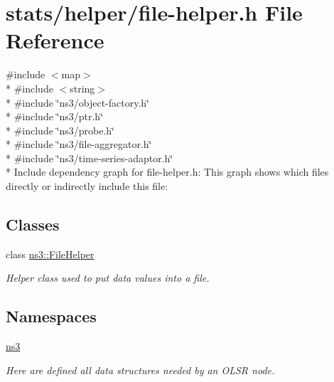 \hypertarget{file-helper_8h}{}\section{stats/helper/file-\/helper.h File Reference}
\label{file-helper_8h}
{\ttfamily \#include $<$map$>$}\\*
{\ttfamily \#include $<$string$>$}\\*
{\ttfamily \#include \char`\"{}ns3/object-\/factory.\+h\char`\"{}}\\*
{\ttfamily \#include \char`\"{}ns3/ptr.\+h\char`\"{}}\\*
{\ttfamily \#include \char`\"{}ns3/probe.\+h\char`\"{}}\\*
{\ttfamily \#include \char`\"{}ns3/file-\/aggregator.\+h\char`\"{}}\\*
{\ttfamily \#include \char`\"{}ns3/time-\/series-\/adaptor.\+h\char`\"{}}\\*
Include dependency graph for file-\/helper.h\+:
This graph shows which files directly or indirectly include this file\+:
\subsection*{Classes}
\begin{DoxyCompactItemize}
\item 
class \hyperlink{classns3_1_1FileHelper}{ns3\+::\+File\+Helper}
\begin{DoxyCompactList}\small\item\em Helper class used to put data values into a file. \end{DoxyCompactList}\end{DoxyCompactItemize}
\subsection*{Namespaces}
\begin{DoxyCompactItemize}
\item 
 \hyperlink{namespacens3}{ns3}
\begin{DoxyCompactList}\small\item\em Here are defined all data structures needed by an O\+L\+SR node. \end{DoxyCompactList}\end{DoxyCompactItemize}
